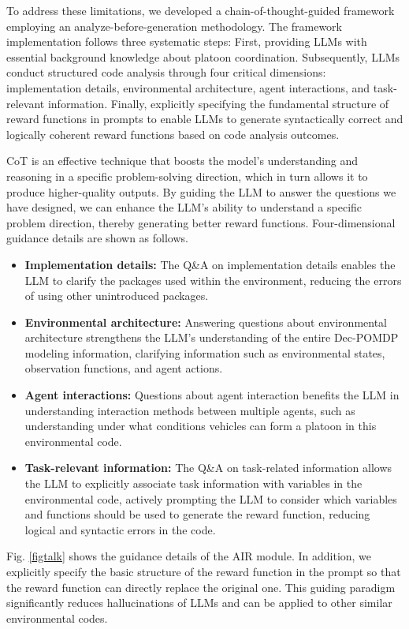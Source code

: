 \documentclass[lettersize,journal]{IEEEtran}
\begin{document}
To address these limitations, we developed a chain-of-thought-guided framework employing an analyze-before-generation methodology. The framework implementation follows three systematic steps: First, providing LLMs with essential background knowledge about platoon coordination. Subsequently, LLMs conduct structured code analysis through four critical dimensions: implementation details, environmental architecture, agent interactions, and task-relevant information. Finally, explicitly specifying the fundamental structure of reward functions in prompts to enable LLMs to generate syntactically correct and logically coherent reward functions based on code analysis outcomes.

CoT is an effective technique that boosts the model's understanding and reasoning in a specific problem-solving direction, which in turn allows it to produce higher-quality outputs.
By guiding the LLM to answer the questions we have designed, we can enhance the LLM's ability to understand a specific problem direction, thereby generating better reward functions. 
Four-dimensional guidance details are shown as follows.
\begin{itemize}
    \item [-] \textbf{Implementation details:} The Q\&A on implementation details enables the LLM to clarify the packages used within the environment, reducing the errors of using other unintroduced packages. 
    \item [-] \textbf{Environmental architecture:} Answering questions about environmental architecture strengthens the LLM's understanding of the entire Dec-POMDP modeling information, clarifying information such as environmental states, observation functions, and agent actions. 
    \item [-] \textbf{Agent interactions:} Questions about agent interaction benefits the LLM in understanding interaction methods between multiple agents, such as understanding under what conditions vehicles can form a platoon in this environmental code.  
    \item [-] \textbf{Task-relevant information:} The Q\&A on task-related information allows the LLM to explicitly associate task information with variables in the environmental code, actively prompting the LLM to consider which variables and functions should be used to generate the reward function, reducing logical and syntactic errors in the code.  
\end{itemize}
Fig. \ref{figtalk} shows the guidance details of the AIR module.
In addition, we explicitly specify the basic structure of the reward function in the prompt so that the reward function can directly replace the original one. 
This guiding paradigm significantly reduces hallucinations of LLMs and can be applied to other similar environmental codes.
\end{document}
